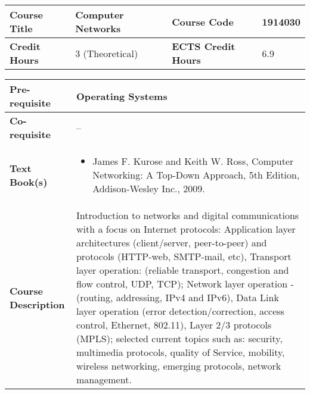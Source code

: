 \documentclass[12pt]{article}
\begin{document}
\begin{minipage}{\textwidth}
\begin{tabularx}{\textwidth}{|l|X|l|X|}
\hline
\textbf{Course Title}       & Computer Networks  & \textbf{Course Code}       &   1914030 \\ \hline
\textbf{Credit Hours}       &  3 (Theoretical) & \textbf{ECTS Credit Hours}       &   6.9 \\ \hline
\end{tabularx}

\begin{tabularx}{\textwidth}{|l|X|}
\hline
\textbf{Pre-requisite}      & Operating Systems \\ \hline
\textbf{Co-requisite}       &  -- \\ \hline
\textbf{Text Book(s)}      & \begin{minipage}{.70\textwidth}
					\begin{itemize} \itemsep-0.4em
						\vspace{3mm}
						\item James F. Kurose and Keith W. Ross, Computer Networking: A Top-Down Approach, 5th Edition, Addison-Wesley Inc., 2009.
						\vspace{3mm}
					\end{itemize}
				\end{minipage}  \\ \hline
\textbf{Course Description} & \begin{minipage}{.70\textwidth}
					\vspace{3mm}
					Introduction to networks and digital communications with a focus on Internet protocols: Application layer architectures (client/server, peer-to-peer) and protocols (HTTP-web, SMTP-mail, etc), Transport layer operation: (reliable transport, congestion and flow control, UDP, TCP); Network layer operation - (routing, addressing, IPv4 and IPv6), Data Link layer operation (error detection/correction, access control, Ethernet, 802.11), Layer 2/3 protocols (MPLS); selected current topics such as: security, multimedia protocols, quality of Service, mobility, wireless networking, emerging protocols, network management.

					\vspace{3mm}
					\end{minipage} \\ \hline
\end{tabularx}
\end{minipage}


\bigskip
\bigskip
\end{document}
